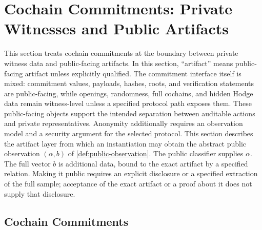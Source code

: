 \section{Cochain Commitments: Private Witnesses and Public Artifacts}\label{sec:public-artifacts-commitments}

This section treats cochain commitments at the boundary between private witness
data and public-facing artifacts. In this section, ``artifact'' means
public-facing artifact unless explicitly qualified. The commitment interface
itself is mixed: commitment values, payloads, hashes, roots, and verification
statements are public-facing, while openings, randomness, full cochains, and
hidden Hodge data remain witness-level unless a specified protocol path exposes
them.
These public-facing objects support the intended separation between auditable
actions and private representatives. Anonymity additionally requires an
observation model and a security argument for the selected protocol.
This section describes the artifact layer from which an instantiation may
obtain the abstract public observation \((\alpha,b)\) of
\cref{def:public-observation}. The public classifier supplies \(\alpha\).
The full vector \(b\) is additional data, bound to the exact artifact by a
specified relation. Making it public requires an explicit disclosure or a
specified extraction of the full sample; acceptance of the exact artifact or
a proof about it does not supply that disclosure.

\subsection{Cochain Commitments}

